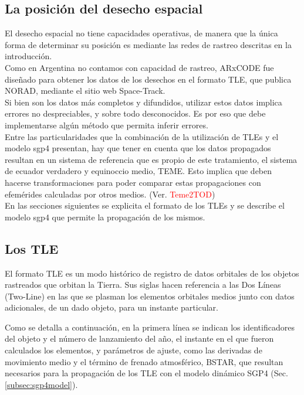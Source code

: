 \subsection*{La posici\'on del desecho espacial}
El desecho espacial no tiene capacidades operativas, de manera que la \'unica forma de determinar su posici\'on es mediante las redes de rastreo descritas en la introducci\'on.\\
Como en Argentina no contamos con capacidad de rastreo, ARxCODE fue dise\~nado para obtener los datos de los desechos en el formato TLE, que publica NORAD, mediante el sitio web Space-Track.\\
Si bien son los datos m\'as completos y difundidos, utilizar estos datos implica errores no despreciables, y sobre todo desconocidos. Es por eso que debe implementarse alg\'un m\'etodo que permita inferir errores.\\
Entre las particularidades que la combinaci\'on de la utilizaci\'on de TLEs y el modelo sgp4 presentan, hay que tener en cuenta que los datos propagados resultan en un sistema de referencia que es propio de este tratamiento, el sistema de ecuador verdadero y equinoccio medio, \ac{TEME}. Esto implica que deben hacerse transformaciones para poder comparar estas propagaciones con efem\'erides calculadas por otros medios. (Ver. \textcolor{red}{Teme2TOD})\\
En las secciones siguientes se explicita el formato de los TLEs y se describe el modelo sgp4 que permite la propagaci\'on de los mismos.\\

\subsection*{Los TLE}{\label{subsec:tleformat}}

El formato TLE es un modo hist\'orico de registro de datos orbitales de los objetos rastreados que orbitan la Tierra. Sus siglas  hacen referencia a las Dos L\'ineas (Two-Line) en las que se plasman los elementos orbitales medios junto con datos adicionales, de un dado objeto, para un instante particular.

Como se detalla a continuación, en la primera l\'inea se indican los identificadores del objeto y el n\'umero de lanzamiento del año, el instante en el que fueron calculados los elementos, y parámetros de ajuste, como las derivadas de movimiento medio y el t\'ermino de frenado atmosf\'erico, BSTAR, que resultan necesarios para la propagación de los TLE con el modelo dinámico SGP4 (Sec. \ref{subsec:sgp4model}).

